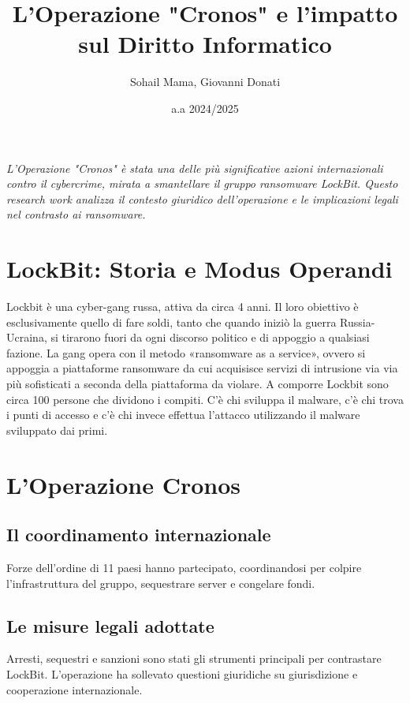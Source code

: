 \documentclass[a4paper,12pt]{article}
\title{L'Operazione "Cronos" e l'impatto sul Diritto Informatico}
\author{Sohail Mama, Giovanni Donati}
\date{a.a 2024/2025}
\begin{document}
\maketitle

\vfill
\begin{center}
\textit{L'Operazione "Cronos" è stata una delle più significative azioni internazionali contro il cybercrime, mirata a smantellare il gruppo ransomware LockBit. Questo research work analizza il contesto giuridico dell'operazione e le implicazioni legali nel contrasto ai ransomware.    }
\end{center}
\vfill


 


\newpage
\tableofcontents
\newpage

\section{LockBit: Storia e Modus Operandi}
Lockbit è una cyber-gang russa, attiva da circa 4 anni. Il loro obiettivo è esclusivamente quello di fare soldi, tanto che quando iniziò la guerra Russia-Ucraina, si tirarono fuori da ogni discorso politico e di appoggio a qualsiasi fazione.
\newline
\newline
La gang opera con il metodo «ransomware as a service», ovvero si appoggia a piattaforme ransomware da cui acquisisce servizi di intrusione via via più sofisticati a seconda della piattaforma da violare. A comporre Lockbit sono circa 100 persone che dividono i compiti. C’è chi sviluppa il malware, c’è chi trova i punti di accesso e c’è chi invece effettua l’attacco utilizzando il malware sviluppato dai primi.

\section{L'Operazione Cronos}
\subsection{Il coordinamento internazionale}
Forze dell'ordine di 11 paesi hanno partecipato, coordinandosi per colpire l'infrastruttura del gruppo, sequestrare server e congelare fondi.

\subsection{Le misure legali adottate}
Arresti, sequestri e sanzioni sono stati gli strumenti principali per contrastare LockBit. L'operazione ha sollevato questioni giuridiche su giurisdizione e cooperazione internazionale.
\end{document}
